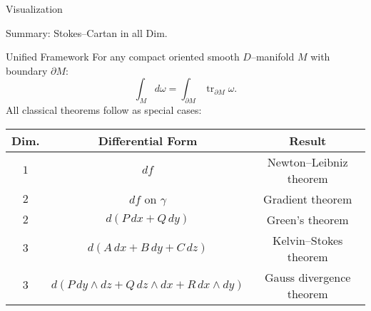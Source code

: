 \begin{frame}{Visualization}
\begin{center}
\end{center}
\end{frame}

\begin{frame}{Summary: Stokes–Cartan in all Dim.}
\vspace{-0.3cm}
\begin{block}{Unified Framework}
For any compact oriented smooth $D$–manifold $M$ with boundary $\partial M$:
\vspace{-0.2cm}
\[
\boxed{\int_M d\omega=\int_{\partial M}\operatorname{tr}_{\partial M}\omega.}
\]
All classical theorems follow as special cases:
\vspace{-0.2cm}
\small
\begin{center}
\renewcommand{\arraystretch}{1.3}
\begin{tabular}{c|c|c}
\textbf{Dim.} & \textbf{Differential Form} & \textbf{Result}\\
\hline
$1$ & $df$ & Newton–Leibniz theorem\\
$2$ & $df$ on $\gamma$ & Gradient theorem\\
$2$ & $d(P\,dx+Q\,dy)$ & Green’s theorem\\
$3$ & $d(A\,dx+B\,dy+C\,dz)$ & Kelvin–Stokes theorem\\
$3$ & $d(P\,dy\wedge dz+Q\,dz\wedge dx+R\,dx\wedge dy)$ & Gauss divergence theorem
\end{tabular}
\end{center}
\end{block}
\end{frame}



